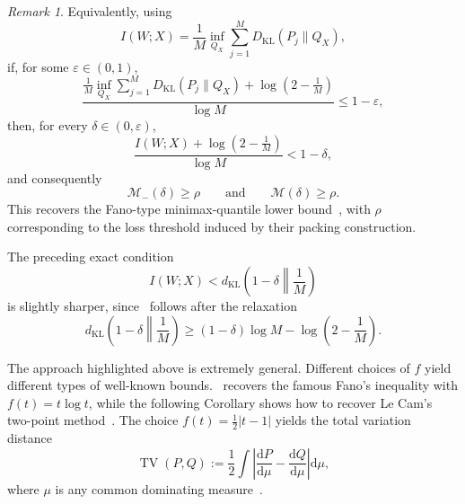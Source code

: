 \documentclass[11pt]{article}
\theoremstyle{definition}
\theoremstyle{remark}
\newtheorem{remark}[theorem]{Remark}
\newcommand{\1}{\boldsymbol{1}}
\begin{document}
\begin{remark}
Equivalently, using
\[
    I(W;X)
    =
    \frac1M
    \inf_{Q_X}
    \sum_{j=1}^M
    D_{\mathrm{KL}}(P_j\|Q_X),
\]
if, for some $\varepsilon\in(0,1)$,
\begin{equation}
    \frac{
    \frac1M
    \inf_{Q_X}
    \sum_{j=1}^M
    D_{\mathrm{KL}}(P_j\|Q_X)
    +
    \log\left(2-\frac1M\right)
    }{
    \log M
    }
    \leq
    1-\varepsilon,
\end{equation}
then, for every $\delta\in(0,\varepsilon)$,
\begin{equation}
    \frac{
    I(W;X)+\log\left(2-\frac1M\right)
    }{
    \log M
    }
    <
    1-\delta,
\end{equation}
and consequently
\begin{equation}
    \mathcal M_{-}(\delta)\geq\rho
    \qquad\text{and}\qquad
    \mathcal M(\delta)\geq\rho.
\end{equation}
This recovers the Fano-type minimax-quantile lower bound~\cite[Lemma 7]{MaVerchandSamworth2024}, with $\rho$ corresponding to the loss threshold
induced by their packing construction.

The preceding exact condition
\[
    I(W;X)
    <
    d_{\mathrm{KL}}
    \left(
    1-\delta
    \middle\|
    \frac1M
    \right)
\]
is slightly sharper, since~\cite[Lemma 7]{MaVerchandSamworth2024} follows after
the relaxation
\[
    d_{\mathrm{KL}}
    \left(
    1-\delta
    \middle\|
    \frac1M
    \right)
    \geq
    (1-\delta)\log M
    -
    \log\left(2-\frac1M\right).
\]
\end{remark}
The approach highlighted above is extremely general. Different choices of \(f\) yield different types of well-known bounds.~ recovers the famous Fano's inequality with $f(t)=t\log t$, while the following Corollary shows how to recover Le Cam's two-point method~\cite{Fano1961,LeCam1973,Yu1997}.
The choice $f(t)=\frac12|t-1|$ yields the total variation distance
\[
\operatorname{TV}(P,Q)
:=\frac12\int\left|\frac{\mathrm dP}{\mathrm d\mu}-\frac{\mathrm dQ}{\mathrm d\mu}\right|\mathrm d\mu,
\]
where $\mu$ is any common dominating measure~\cite{AliSilvey1966,Csiszar1967}.
\end{document}
